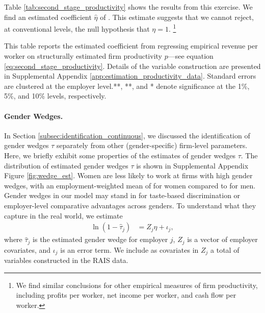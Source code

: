 Table \ref{tab:second_stage_productivity} shows the results from this exercise. We find an estimated coefficient $\hat{\eta}$ of . This estimate suggests that we cannot reject, at conventional levels, the null hypothesis that $\eta = 1$.%
%
\footnote{We find similar conclusions for other empirical measures of firm productivity, including profits per worker, net income per worker, and cash flow per worker.} %

%
\begin{table}[htbp!]
    \caption{Regressing empirical productivity measures on model estimates of firm productivity}
    \label{tab:second_stage_productivity}
    \begin{normalsize}
    
    \end{normalsize}
    \begin{tablenotes}
        \footnotesize
        This table reports the estimated coefficient from regressing empirical revenue per worker on structurally estimated firm productivity $p$---see equation \eqref{eq:second_stage_productivity}. Details of the variable construction are presented in Supplemental Appendix \ref{app:estimation_productivity_data}. Standard errors are clustered at the employer level.\ifshowstars ***, **, and * denote significance at the 1\%, 5\%, and 10\% levels, respectively.\fi{}%
    \end{tablenotes}
    \begin{tablenotes}[Source]
        \sourcemodel%
    \end{tablenotes}
\end{table}
%


\paragraph{Gender Wedges.\label{paragraph:estimation_wedges}}

In Section \ref{subsec:identification_continuous}, we discussed the identification of gender wedges $\tau$ separately from other (gender-specific) firm-level parameters. Here, we briefly exhibit some properties of the estimates of gender wedges $\tau$. The distribution of estimated gender wedges $\tau$ is shown in Supplemental Appendix Figure \ref{fig:wedge_est}. Women are less likely to work at firms with high gender wedges, with an employment-weighted mean of  for women compared to  for men.
%
Gender wedges in our model may stand in for taste-based discrimination or employer-level comparative advantages across genders. To understand what they capture in the real world, we estimate
%
\begin{align}
    \ln(1 - \widehat{\tau}_{j}) &= Z_{j}\eta + \iota_{j}, \label{eq:second_stage_wedges}
\end{align}
%
where $\widehat{\tau}_{j}$ is the estimated gender wedge for employer $j$, $Z_{j}$ is a vector of employer covariates, and $\iota_{j}$ is an error term. We include as covariates in $Z_{j}$ a total of {\NWedgeCovariates} variables constructed in the RAIS data.

